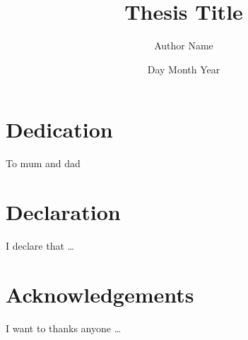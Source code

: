 \documentclass[12pt,twoside]{report}
\title{Thesis Title}
\author{Author Name}
\date{Day Month Year}
\begin{document}
	
	

	\chapter*{Dedication}
	To mum and dad

	\chapter*{Declaration}
	I declare that \ldots

	\chapter*{Acknowledgements}
	I want to thanks anyone \ldots

	\tableofcontents
	\listoffigures
	\listoftables

	\nocite{*} %
	\pagestyle{plain}
	\printbibliography[
		heading=bibintoc,
	]


	

	

	

	

	

	\appendix
	
\end{document}
